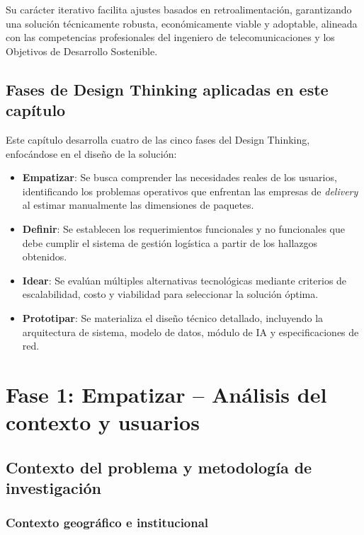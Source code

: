 Su carácter iterativo facilita ajustes basados en retroalimentación, garantizando una solución técnicamente robusta, económicamente viable y adoptable, alineada con las competencias profesionales del ingeniero de telecomunicaciones y los Objetivos de Desarrollo Sostenible.

\subsection{Fases de Design Thinking aplicadas en este capítulo}

Este capítulo desarrolla cuatro de las cinco fases del Design Thinking, enfocándose en el diseño de la solución:

\begin{itemize}
    \item \textbf{Empatizar}: Se busca comprender las necesidades reales de los usuarios, identificando los problemas operativos que enfrentan las empresas de \textit{delivery} al estimar manualmente las dimensiones de paquetes.
    
    \item \textbf{Definir}: Se establecen los requerimientos funcionales y no funcionales que debe cumplir el sistema de gestión logística a partir de los hallazgos obtenidos.
    
    \item \textbf{Idear}: Se evalúan múltiples alternativas tecnológicas mediante criterios de escalabilidad, costo y viabilidad para seleccionar la solución óptima.
    
    \item \textbf{Prototipar}: Se materializa el diseño técnico detallado, incluyendo la arquitectura de sistema, modelo de datos, módulo de IA y especificaciones de red.
\end{itemize}

\section{Fase 1: Empatizar – Análisis del contexto y usuarios}

\subsection{Contexto del problema y metodología de investigación}

\subsubsection{Contexto geográfico e institucional}


